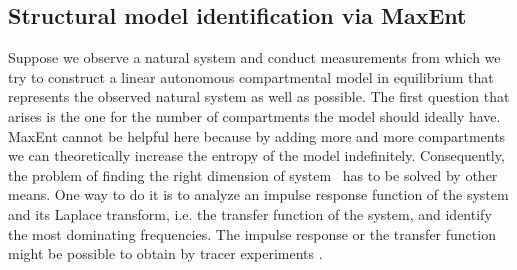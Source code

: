 \documentclass[smallextended]{svjour3}
\makeatletter
\renewcommand*{\eqref}[1]{%
  \hyperref[{#1}]{\textup{\tagform@{\ref*{#1}}}}%
}
\makeatother
\begin{document}
\subsection{Structural model identification via MaxEnt}
Suppose we observe a natural system and conduct measurements from which we try to construct a linear autonomous compartmental model in equilibrium that represents the observed natural system as well as possible.
The first question that arises is the one for the number of compartments the model should ideally have.
MaxEnt cannot be helpful here because by adding more and more compartments we can theoretically increase the entropy of the model indefinitely.
Consequently, the problem of finding the right dimension of system~\eqref{eqn:lin_CS_sys} has to be solved by other means.
One way to do it is to analyze an impulse response function of the system and its Laplace transform, i.e. the transfer function of the system, and identify the most dominating frequencies.
The impulse response or the transfer function might be possible to obtain by tracer experiments \citep{Anderson1983, Walter1986MBS}.
\end{document}
